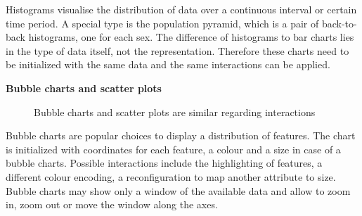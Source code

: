 Histograms visualise the distribution of data over a continuous interval or certain time period.
A special type is the population pyramid, which is a pair of back-to-back histograms, one for each sex.
The difference of histograms to bar charts lies in the type of data itself, not the representation.
Therefore these charts need to be initialized with the same data and the same interactions can be applied.


\textbf{Bubble charts and scatter plots}

\begin{figure}
  \centering
    \qquad
    \caption{Bubble charts and scatter plots are similar regarding interactions}%
    \label{fig:concept:chart-types:bubble-chart}
\end{figure}

Bubble charts are popular choices to display a distribution of features.
The chart is initialized with coordinates for each feature, a colour and a size in case of a bubble charts.
Possible interactions include the highlighting of features, a different colour encoding, a reconfiguration to map another attribute to size.
Bubble charts may show only a window of the available data and allow to zoom in, zoom out or move the window along the axes.


